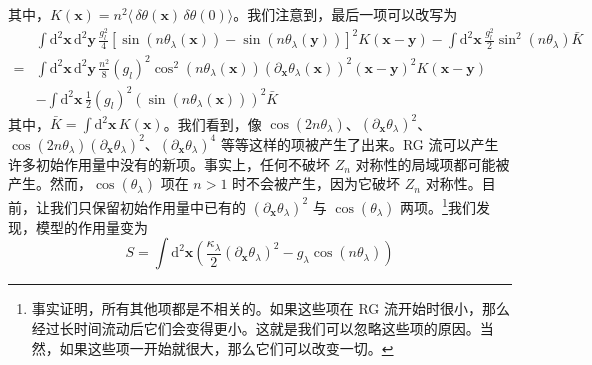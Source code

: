 其中，$K(\pmb{x}) = n^2\langle\,\delta\theta(\pmb{x})\,\delta\theta(0)\rangle$。我们注意到，最后一项可以改写为
\begin{align*}
&\int \mathrm{d}^2\pmb{x}\,\mathrm{d}^2\pmb{y}\,\frac{g_l^2}{4}[\sin(n\theta_\lambda(\pmb{x})) - \sin(n\theta_\lambda(\pmb{y}))]^2 K(\pmb{x}-\pmb{y}) - \int \mathrm{d}^2\pmb{x}\,\frac{g_l^2}{2}\sin^2(n\theta_\lambda)\bar{K} \\
={}& \int \mathrm{d}^2\pmb{x}\,\mathrm{d}^2\pmb{y}\,\frac{n^2}{8}(g_l)^2\cos^2(n\theta_\lambda(\pmb{x}))(\partial_{\pmb{x}}\theta_\lambda(\pmb{x}))^2(\pmb{x}-\pmb{y})^2 K(\pmb{x}-\pmb{y}) \\
&- \int \mathrm{d}^2\pmb{x}\,\frac{1}{2}(g_l)^2(\sin(n\theta_\lambda(\pmb{x})))^2\bar{K}
\end{align*}
其中，$\bar{K} = \int \mathrm{d}^2\pmb{x}\,K(\pmb{x})$。我们看到，像 $\cos(2n\theta_\lambda)$、$(\partial_{\pmb{x}}\theta_\lambda)^2$、$\cos(2n\theta_\lambda)(\partial_{\pmb{x}}\theta_\lambda)^2$、$(\partial_{\pmb{x}}\theta_\lambda)^4$ 等等这样的项被产生了出来。RG 流可以产生许多初始作用量中没有的新项。事实上，任何不破坏 $Z_n$ 对称性的局域项都可能被产生。然而，$\cos(\theta_\lambda)$ 项在 $n>1$ 时不会被产生，因为它破坏 $Z_n$ 对称性。目前，让我们只保留初始作用量中已有的 $(\partial_{\pmb{x}}\theta_\lambda)^2$ 与 $\cos(\theta_\lambda)$ 两项。\footnote{事实证明，所有其他项都是不相关的。如果这些项在 RG 流开始时很小，那么经过长时间流动后它们会变得更小。这就是我们可以忽略这些项的原因。当然，如果这些项一开始就很大，那么它们可以改变一切。}我们发现，模型的作用量变为
\begin{equation*}
S = \int \mathrm{d}^2\pmb{x}\left(\frac{\kappa_\lambda}{2}(\partial_{\pmb{x}}\theta_\lambda)^2 - g_\lambda\cos(n\theta_\lambda)\right)\tag{3.5.8}
\end{equation*}
